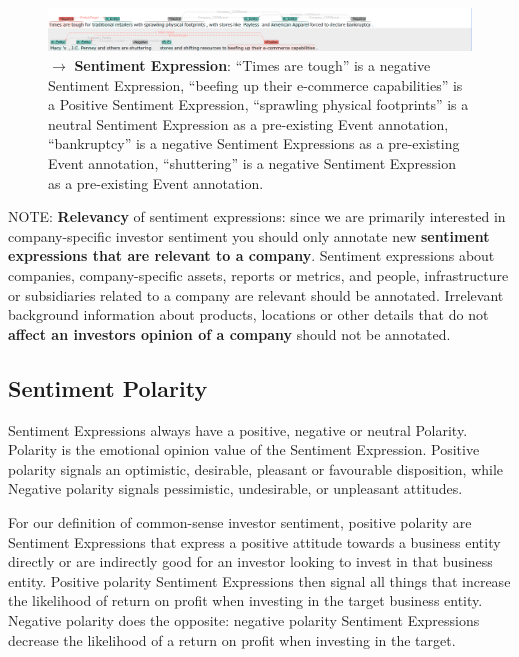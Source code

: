 \begin{figure}[h]
    \centering
    \includegraphics[width=\textwidth]{img/amzn00s9-10 negative event example.png}
    \caption*{$\rightarrow$ \textbf{Sentiment Expression}: ``Times are tough'' is a negative Sentiment Expression, ``beefing up their e-commerce capabilities'' is a Positive Sentiment Expression, ``sprawling physical footprints'' is a neutral Sentiment Expression as a pre-existing Event annotation, ``bankruptcy'' is a negative Sentiment Expressions  as a pre-existing Event annotation, ``shuttering'' is a negative Sentiment Expression as a pre-existing Event annotation.}
    \label{fig:se_ex2}
\end{figure}

\noindent
\textcolor{BrickRed}{NOTE: \textbf{Relevancy} of sentiment expressions: since we are primarily interested in company-specific investor sentiment you should only annotate new \textbf{sentiment expressions that are relevant to a company}. Sentiment expressions about companies, company-specific assets, reports or metrics, and people, infrastructure or subsidiaries related to a company are relevant should be annotated. Irrelevant background information about products, locations or other details that do not \textbf{affect an investors opinion of a company} should not be annotated.}

\subsection{Sentiment Polarity}
\label{sec:polaritydefinition}
Sentiment Expressions always have a positive, negative or neutral Polarity.
Polarity is the emotional opinion value of the Sentiment Expression.
Positive polarity signals an optimistic, desirable, pleasant or favourable disposition, while Negative polarity signals pessimistic, undesirable, or unpleasant attitudes.

For our definition of common-sense investor sentiment, positive polarity are Sentiment Expressions that express a positive attitude towards a business entity directly or are indirectly good for an investor looking to invest in that business entity. Positive polarity Sentiment Expressions then signal all things that increase the likelihood of return on profit when investing in the target business entity.
Negative polarity does the opposite: negative polarity Sentiment Expressions decrease the likelihood of a return on profit when investing in the target.

